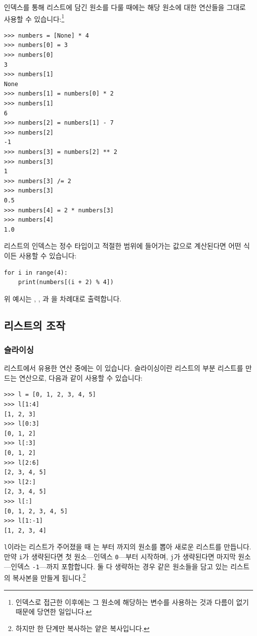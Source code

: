 \documentclass[../main.tex]{subfiles}
\begin{document}
인덱스를 통해 리스트에 담긴 원소를 다룰 때에는 해당 원소에 대한 연산들을 그대로 사용할 수 있습니다:\footnote{인덱스로 접근한 이후에는 그 원소에 해당하는 변수를 사용하는 것과 다름이 없기 때문에 당연한 일입니다.}
\begin{verbatim}
>>> numbers = [None] * 4
>>> numbers[0] = 3
>>> numbers[0]
3
>>> numbers[1]
None
>>> numbers[1] = numbers[0] * 2
>>> numbers[1]
6
>>> numbers[2] = numbers[1] - 7
>>> numbers[2]
-1
>>> numbers[3] = numbers[2] ** 2
>>> numbers[3]
1
>>> numbers[3] /= 2
>>> numbers[3]
0.5
>>> numbers[4] = 2 * numbers[3]
>>> numbers[4]
1.0
\end{verbatim}

리스트의 인덱스는 정수 타입이고 적절한 범위에 들어가는 값으로 계산된다면 어떤 식이든 사용할 수 있습니다:
\begin{verbatim}
for i in range(4):
    print(numbers[(i + 2) % 4])
\end{verbatim}
위 예시는 , , 과 을 차례대로 출력합니다.

\subsection{리스트의 조작}
\subsubsection{슬라이싱}
리스트에서 유용한 연산 중에는 이 있습니다.
슬라이싱이란 리스트의 부분 리스트를 만드는 연산으로, 다음과 같이 사용할 수 있습니다:
\begin{verbatim}
>>> l = [0, 1, 2, 3, 4, 5]
>>> l[1:4]
[1, 2, 3]
>>> l[0:3]
[0, 1, 2]
>>> l[:3]
[0, 1, 2]
>>> l[2:6]
[2, 3, 4, 5]
>>> l[2:]
[2, 3, 4, 5]
>>> l[:]
[0, 1, 2, 3, 4, 5]
>>> l[1:-1]
[1, 2, 3, 4]
\end{verbatim}

\texttt{l}이라는 리스트가 주어졌을 때 는 부터 까지의 원소를 뽑아 새로운 리스트를 만듭니다.
만약 \texttt{i}가 생략된다면 첫 원소---인덱스 \verb/0/---부터 시작하며, \texttt{j}가 생략된다면 마지막 원소---인덱스 \verb/-1/---까지 포함합니다.
둘 다 생략하는 경우 같은 원소들을 담고 있는 리스트의 복사본을 만들게 됩니다.\footnote{하지만 한 단계만 복사하는 얕은 복사입니다.}
\end{document}
